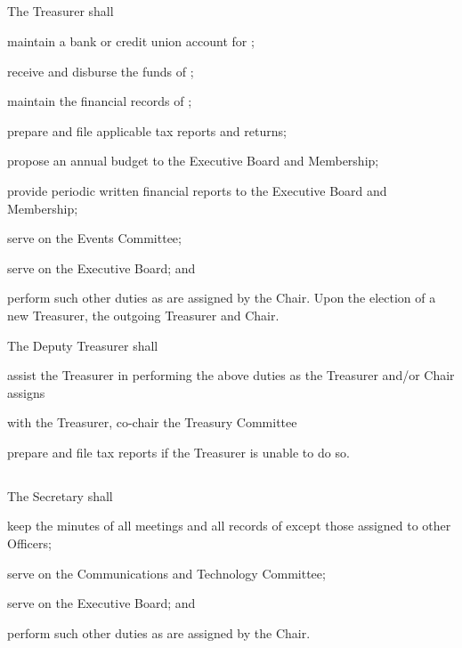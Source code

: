 \subsection{}
The Treasurer shall
\begin{inlinealphalist}
    \item maintain a bank or credit union account for \thedistrict{};
    \item receive and disburse the funds of \thedistrict{};
    \item maintain the financial records of \thedistrict{};
    \item prepare and file applicable tax reports and returns;
    \item propose an annual budget to the Executive Board and Membership;
    \item provide periodic written financial reports to the Executive Board and Membership;
    \item serve on the Events Committee;
    \item serve on the Executive Board; and
    \item perform such other duties as are assigned by the Chair. Upon the election of a new Treasurer, the outgoing Treasurer and Chair.
\end{inlinealphalist}

The Deputy Treasurer shall
\begin{inlinealphalist}
    \item assist the Treasurer in performing the above duties as the Treasurer and/or Chair assigns
    \item with the Treasurer, co-chair the Treasury Committee
    \item prepare and file tax reports if the Treasurer is unable to do so.
\end{inlinealphalist}

\subsection{}
The Secretary shall
\begin{inlinealphalist}
    \item keep the minutes of all meetings and all records of \thedistrict{} except those assigned to other Officers;
    \item serve on the Communications and Technology Committee;
    \item serve on the Executive Board; and
    \item perform such other duties as are assigned by the Chair.
\end{inlinealphalist}

